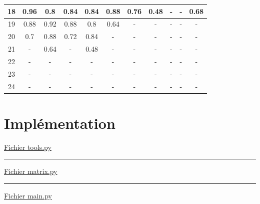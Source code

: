 \documentclass[french,nochapter,11pt]{rapportUB}
\begin{document}
\begin{table}[htbp]
\begin{tabular}{|c|c|c|c|c|c|c|c|c|c|c|}
    \hline
    18&0.96	&0.8	&0.84	&0.84	&0.88	&0.76	&0.48	&-	&-	&0.68 \\
    \hline
    19&0.88	&0.92	&0.88	&0.8	&0.64	&-	&-	&-	&-	&- \\
    \hline
    20&0.7	&0.88	&0.72	&0.84	&-	&-	&-	&-	&-	&- \\
    \hline
    21&-	&0.64	&-	&0.48	&-	&-	&-	&-	&-	&- \\
    \hline
    22&-	&-	&-	&-	&-	&-	&-	&-	&-	&- \\
    \hline
    23&-	&-	&-	&-	&-	&-	&-	&-	&-	&- \\
    \hline
    24&-	&-	&-	&-	&-	&-	&-	&-	&-	&- \\
    \hline
  \end{tabular}
\end{table}%
\clearpage
\section{Implémentation}
\label{sec:annexe}
\underline{Fichier tools.py}

\mbox{}\hfill\rule{0.5\linewidth}{1mm}\hfill\mbox{}
\vspace{0.3cm}\newline
\underline{Fichier matrix.py}

\mbox{}\hfill\rule{0.5\linewidth}{1mm}\hfill\mbox{}
\vspace{0.3cm}\newline
\underline{Fichier main.py}

\end{document}
